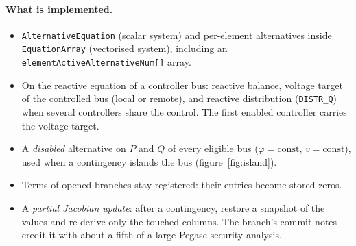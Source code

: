 \documentclass[11pt,a4paper]{article}
\newcommand{\code}[1]{\texttt{\small #1}}
\begin{document}
\paragraph{What is implemented.}
\begin{itemize}
\item \code{AlternativeEquation} (scalar system) and per-element alternatives inside
      \code{EquationArray} (vectorised system), including an
      \code{elementActiveAlternativeNum[]} array.
\item On the reactive equation of a controller bus: reactive balance, voltage target of
      the controlled bus (local or remote), and reactive distribution (\code{DISTR\_Q})
      when several controllers share the control. The first enabled controller carries
      the voltage target.
\item A \emph{disabled} alternative on $P$ and $Q$ of every eligible bus
      ($\varphi = \text{const}$, $v = \text{const}$), used when a contingency islands the
      bus (figure~\ref{fig:island}).
\item Terms of opened branches stay registered: their entries become stored zeros.
\item A \emph{partial Jacobian update}: after a contingency, restore a snapshot of the
      values and re-derive only the touched columns. The branch's commit notes credit it
      with about a fifth of a large Pegase security analysis.
\end{itemize}
\end{document}
